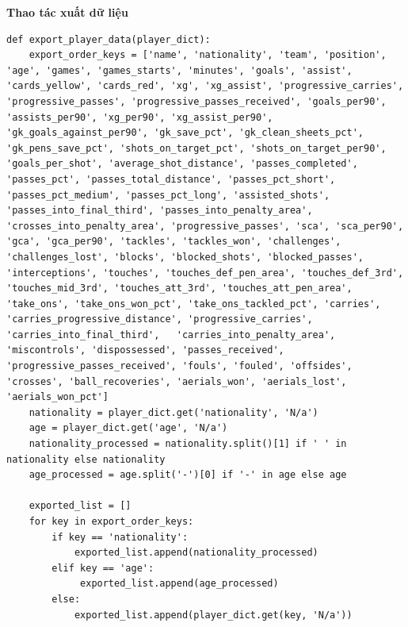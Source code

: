 \documentclass[12pt]{report}
\begin{document}
{\textbf*{Thao tác xuất dữ liệu}
\begin{lstlisting}
def export_player_data(player_dict):
    export_order_keys = ['name', 'nationality', 'team', 'position', 'age', 'games', 'games_starts', 'minutes', 'goals', 'assist', 'cards_yellow', 'cards_red', 'xg', 'xg_assist', 'progressive_carries', 'progressive_passes', 'progressive_passes_received', 'goals_per90', 'assists_per90', 'xg_per90', 'xg_assist_per90', 'gk_goals_against_per90', 'gk_save_pct', 'gk_clean_sheets_pct', 'gk_pens_save_pct', 'shots_on_target_pct', 'shots_on_target_per90', 'goals_per_shot', 'average_shot_distance', 'passes_completed', 'passes_pct', 'passes_total_distance', 'passes_pct_short', 'passes_pct_medium', 'passes_pct_long', 'assisted_shots', 'passes_into_final_third', 'passes_into_penalty_area', 'crosses_into_penalty_area', 'progressive_passes', 'sca', 'sca_per90', 'gca', 'gca_per90', 'tackles', 'tackles_won', 'challenges', 'challenges_lost', 'blocks', 'blocked_shots', 'blocked_passes', 'interceptions', 'touches', 'touches_def_pen_area', 'touches_def_3rd', 'touches_mid_3rd', 'touches_att_3rd', 'touches_att_pen_area', 'take_ons', 'take_ons_won_pct', 'take_ons_tackled_pct', 'carries', 'carries_progressive_distance', 'progressive_carries', 'carries_into_final_third',   'carries_into_penalty_area', 'miscontrols', 'dispossessed', 'passes_received', 'progressive_passes_received', 'fouls', 'fouled', 'offsides', 'crosses', 'ball_recoveries', 'aerials_won', 'aerials_lost', 'aerials_won_pct']
    nationality = player_dict.get('nationality', 'N/a')
    age = player_dict.get('age', 'N/a')
    nationality_processed = nationality.split()[1] if ' ' in nationality else nationality
    age_processed = age.split('-')[0] if '-' in age else age

    exported_list = []
    for key in export_order_keys:
        if key == 'nationality':
            exported_list.append(nationality_processed)
        elif key == 'age':
             exported_list.append(age_processed)
        else:
            exported_list.append(player_dict.get(key, 'N/a'))


\end{lstlisting}}
\end{document}
